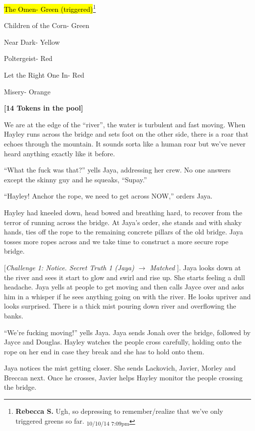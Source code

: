
{\parskip=0pt
\hl{The Omen- Green (triggered)}\footnote{\textbf{Rebecca S. }Ugh, so depressing to remember/realize that we've only triggered greens so far. \textsubscript{10/10/14 7:09pm}}

Children of the Corn- Green

Near Dark- Yellow

Poltergeist- Red

Let the Right One In- Red

Misery- Orange
}


\textbf{{[}14 Tokens in the pool{]}}



We are at the edge of the ``river'', the water is turbulent and fast moving.  When Hayley runs across the bridge and sets foot on the other side, there is a roar that echoes through the mountain.  It sounds sorta like a human roar but we've never heard anything exactly like it before. 

``What the fuck was that?'' yells Jaya, addressing her crew.  No one answers except the skinny guy and he squeaks, ``Supay.''

``Hayley!  Anchor the rope, we need to get across NOW,'' orders Jaya.

Hayley had kneeled down, head bowed and breathing hard, to recover from the terror of running across the bridge.  At Jaya's order, she stands and with shaky hands, ties off the rope to the remaining concrete pillars of the old bridge.  Jaya tosses more ropes across and we take time to construct a more secure rope bridge. 



{[}\textit{Challenge 1: Notice.  Secret Truth 1 (Jaya) $\rightarrow$ Matched }{]}.  Jaya looks down at the river and sees it start to glow and swirl and rise up.  She starts feeling a dull headache.  Jaya yells at people to get moving and then calls Jayce over and asks him in a whisper if he sees anything going on with the river.  He looks upriver and looks surprised.  There is a thick mist pouring down river and overflowing the banks. 

``We're fucking moving!'' yells Jaya.  Jaya sends Jonah over the bridge, followed by Jayce and Douglas.   Hayley watches the people cross carefully, holding onto the rope on her end in case they break and she has to hold onto them.

Jaya notices the mist getting closer.  She sends Lackovich, Javier, Morley and Breccan next.  Once he crosses, Javier helps Hayley monitor the people crossing the bridge.  

